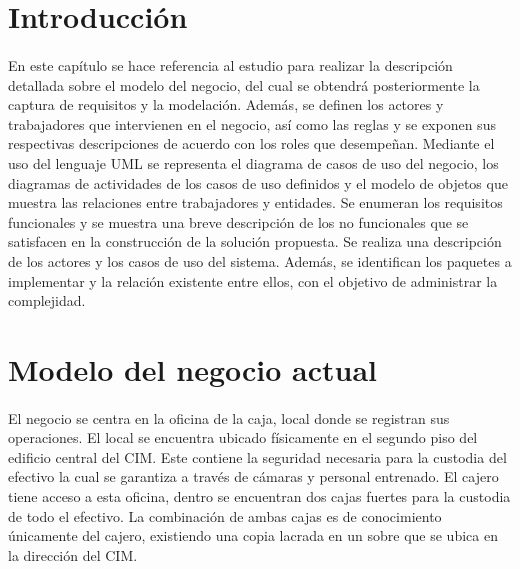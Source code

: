 
\chap{\CapDos} 

\section{Introducción}
\paragraph{}En este capítulo se hace referencia al estudio para realizar la descripción detallada sobre el modelo del negocio, del cual se obtendrá posteriormente la captura de requisitos y la modelación. Además, se definen los actores y trabajadores que intervienen en el negocio, así como las reglas y se exponen sus respectivas descripciones de acuerdo con los roles que desempeñan. Mediante el uso del lenguaje UML se representa el diagrama de casos de uso del negocio, los diagramas de actividades de los casos de uso definidos y el modelo de objetos que muestra las relaciones entre trabajadores y entidades. Se enumeran los requisitos funcionales y se muestra una breve descripción de los no funcionales que se satisfacen en la construcción de la solución propuesta. Se realiza una descripción de los actores y los casos de uso del sistema. Además, se identifican los paquetes a implementar y la relación existente entre ellos, con el objetivo de administrar la complejidad.

\section{Modelo del negocio actual}
\paragraph{}El negocio se centra en la oficina de la caja, local donde se registran sus operaciones. El local se encuentra ubicado físicamente en el segundo piso del edificio central del CIM. Este contiene la seguridad necesaria para la custodia del efectivo la cual se garantiza a través de cámaras y personal entrenado. El cajero tiene acceso a esta oficina, dentro se encuentran dos cajas fuertes para la custodia de todo el efectivo. La combinación de ambas cajas es de conocimiento únicamente del cajero, existiendo una copia lacrada en un sobre que se ubica en la direcci\'{o}n del CIM.

